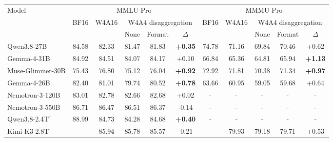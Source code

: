 \begin{tabular}{l|cc | ccc|cc | ccc}
    \toprule
    \multirow{3}{*}{Model} & \multicolumn{5}{c|}{MMLU-Pro} & \multicolumn{5}{c}{MMMU-Pro} \\
    \cmidrule(lr){2-6}\cmidrule(lr){7-11}
     & \multirow{2}{*}{BF16} & \multirow{2}{*}{W4A16} & \multicolumn{3}{c|}{W4A4 disaggregation} & \multirow{2}{*}{BF16} & \multirow{2}{*}{W4A16} & \multicolumn{3}{c}{W4A4 disaggregation} \\
     &  &  & None & Format & $\Delta$ &  &  & None & Format & $\Delta$ \\
    \midrule
    Qwen3.8-27B        & 84.58  & 82.33  & 81.47  & 81.83  & \textbf{+0.35} & 74.78  & 71.16  & 69.84  & 70.46  & +0.62  \\
    Gemma-4-31B        & 84.92  & 84.51  & 84.07  & 84.17  & +0.10  & 66.84  & 65.36  & 64.81  & 65.94  & \textbf{+1.13} \\
    Muse-Glimmer-30B   & 75.43  & 76.80  & 75.12  & 76.04  & \textbf{+0.92} & 72.92  & 71.81  & 70.38  & 71.34  & \textbf{+0.97} \\\midrule
    Gemma-4-26B        & 82.40  & 81.01  & 79.74  & 80.52  & \textbf{+0.78} & 63.66  & 60.95  & 59.05  & 59.68  & +0.64  \\
    Nemotron-3-120B    & 83.01  & 82.78  & 82.66  & 82.68  & +0.02  & -      & -      & -      & -      & -      \\
    Nemotron-3-550B    & 86.71  & 86.47  & 86.51  & 86.37  & -0.14  & -      & -      & -      & -      & -      \\
    Qwen3.8-2.4T$^{\dagger}$ & 88.99  & 84.73  & 84.28  & 84.68  & \textbf{+0.40} & -      & -      & -      & -      & -      \\
    Kimi-K3-2.8T$^{\ddagger}$ & -      & 85.94  & 85.78  & 85.57  & -0.21  & -      & 79.93  & 79.18  & 79.71  & +0.53  \\
    \bottomrule
    \end{tabular}
